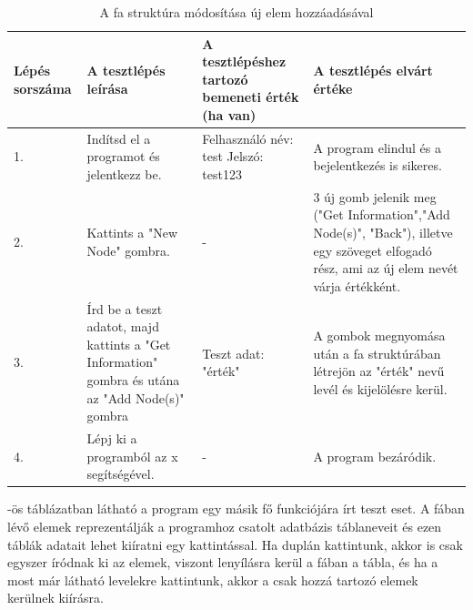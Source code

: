 \begin{table} [h]
	\begin{center}
			\caption{A fa struktúra módosítása új elem hozzáadásával}
		\label{table:addnode}
		\resizebox{\textwidth}{!} {
			\begin{tabular}{ |p{3cm}|p{5cm}|p{5cm}|p{5cm}| } 
				\hline
				Lépés sorszáma & A tesztlépés leírása & A tesztlépéshez tartozó bemeneti érték (ha van) & A tesztlépés elvárt értéke  \\ 
				\hline
				1. & Indítsd el a programot és jelentkezz be. & Felhasználó név: test \newline Jelszó: test123 & A program elindul és a bejelentkezés is sikeres.  \\ 
				\hline
				2. & Kattints a "New Node" gombra. & - & 3 új gomb jelenik meg ("Get Information","Add Node(s)", "Back"), illetve egy szöveget elfogadó rész, ami az új elem nevét várja értékként.\\ 
				\hline
				3. & Írd be a teszt adatot, majd kattints a "Get Information" gombra és utána az "Add Node(s)" gombra & Teszt adat: "érték" & A gombok megnyomása után a fa struktúrában létrejön az "érték" nevű levél és kijelölésre kerül. \\
				\hline
				4. & Lépj ki a programból az x segítségével. & - & A program bezáródik. \\
				\hline
			\end{tabular}
		}
	\end{center}

\end{table}

\newpage

-ös táblázatban látható a program egy másik fő funkciójára írt teszt eset. A fában lévő elemek reprezentálják a programhoz csatolt adatbázis táblaneveit és ezen táblák adatait lehet kiíratni egy kattintással. Ha duplán kattintunk, akkor is csak egyszer íródnak ki az elemek, viszont lenyílásra kerül a fában a tábla, és ha a most már látható levelekre kattintunk, akkor a csak hozzá tartozó elemek kerülnek kiírásra.

